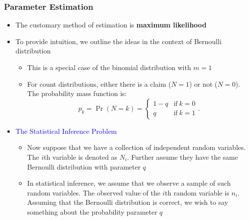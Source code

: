 \documentclass{beamer}
\begin{document}
\begin{frame}%
 \frametitle{Parameter Estimation}
\begin{itemize}
\item The customary method of estimation is \textbf{maximum likelihood} %
\item To provide intuition, we outline the ideas in the context of Bernoulli distribution %
\begin{itemize}
\item This is a special case of the binomial distribution with $m=1$
\item For count distributions, either there is a claim ($N=1$) or not ($N=0$). The probability mass function is:
\begin{equation*}
p_k = \Pr (N=k) = \left\{ \begin{array}{ll}
1-q & \mathrm{if}\ k=0 \\
q& \mathrm{if}\ k=1
\end{array} \right. .
\end{equation*}
\end{itemize} \vspace{2mm}
\item \textcolor{blue}{The Statistical Inference Problem}
\begin{itemize} 
\item Now suppose that we have a collection of independent random variables. The $i$th variable is denoted as $N_i$. Further assume they have the same Bernoulli distribution with parameter $q$ %
\item In statistical inference, we assume that we observe a sample of such random variables. The observed value of the $i$th random variable is $n_i$. Assuming that the Bernoulli distribution is correct, we wish to say something about the probability parameter $q$
\end{itemize}\end{itemize}
\end{frame}
\end{document}
